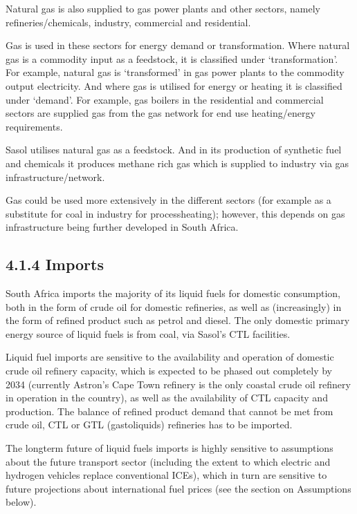 \documentclass[letterpaper,10pt,english]{jupyterBook}
\begin{document}
\sphinxAtStartPar
Natural gas is also supplied to gas power plants and other sectors, namely refineries/chemicals, industry, commercial and residential.

\sphinxAtStartPar
Gas is used in these sectors for energy demand or transformation. Where natural gas is a commodity input as a feedstock, it is classified under ‘transformation’. For example, natural gas is ‘transformed’ in gas power plants to the commodity output electricity. And where gas is utilised for energy or heating it is classified under ‘demand’. For example, gas boilers in the residential and commercial sectors are supplied gas from the gas network for end use heating/energy requirements.

\sphinxAtStartPar
Sasol utilises natural gas as a feedstock. And in its production of synthetic fuel and chemicals it produces methane rich gas which is supplied to industry via gas infrastructure/network.

\sphinxAtStartPar
Gas could be used more extensively in the different sectors (for example as a substitute for coal in industry for process\sphinxhyphen{}heating); however, this depends on gas infrastructure being further developed in South Africa.


\subsection{4.1.4 Imports}
\label{\detokenize{04EnergySupply:imports}}
\sphinxAtStartPar
South Africa imports the majority of its liquid fuels for domestic consumption, both in the form of crude oil for domestic refineries, as well as (increasingly) in the form of refined product such as petrol and diesel. The only domestic primary energy source of liquid fuels is from coal, via Sasol’s CTL facilities.

\sphinxAtStartPar
Liquid fuel imports are sensitive to the availability and operation of domestic crude oil refinery capacity, which is expected to be phased out completely by 2034 (currently Astron’s Cape Town refinery is the only coastal crude oil refinery in operation in the country), as well as the availability of CTL capacity and production. The balance of refined product demand that cannot be met from crude oil, CTL or GTL (gas\sphinxhyphen{}to\sphinxhyphen{}liquids) refineries has to be imported.

\sphinxAtStartPar
The long\sphinxhyphen{}term future of liquid fuels imports is highly sensitive to assumptions about the future transport sector (including the extent to which electric and hydrogen vehicles replace conventional ICEs), which in turn are sensitive to future projections about international fuel prices (see the section on Assumptions below).
\end{document}
